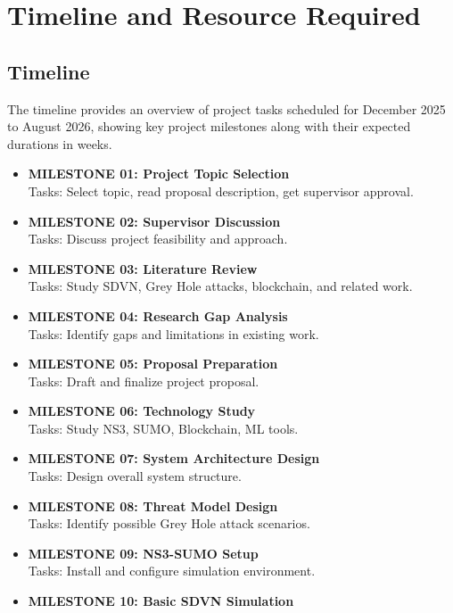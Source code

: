 \documentclass[12pt, a4paper]{report}
\begin{document}
\chapter{Timeline and Resource Required}

\section{Timeline}

The timeline provides an overview of project tasks scheduled for December 2025 to August 2026, showing key project milestones along with their expected durations in weeks.

\begin{itemize}
    \item \textbf{MILESTONE 01: Project Topic Selection} \\
    Tasks: Select topic, read proposal description, get supervisor approval.
    \item \textbf{MILESTONE 02: Supervisor Discussion} \\
    Tasks: Discuss project feasibility and approach.
    \item \textbf{MILESTONE 03: Literature Review} \\
    Tasks: Study SDVN, Grey Hole attacks, blockchain, and related work.
    \item \textbf{MILESTONE 04: Research Gap Analysis} \\
    Tasks: Identify gaps and limitations in existing work.
    \item \textbf{MILESTONE 05: Proposal Preparation} \\
    Tasks: Draft and finalize project proposal.
    \item \textbf{MILESTONE 06: Technology Study} \\
    Tasks: Study NS3, SUMO, Blockchain, ML tools.
    \item \textbf{MILESTONE 07: System Architecture Design} \\
    Tasks: Design overall system structure.
    \item \textbf{MILESTONE 08: Threat Model Design} \\
    Tasks: Identify possible Grey Hole attack scenarios.
    \item \textbf{MILESTONE 09: NS3-SUMO Setup} \\
    Tasks: Install and configure simulation environment.
    \item \textbf{MILESTONE 10: Basic SDVN Simulation} \\

\end{itemize}
\end{document}
